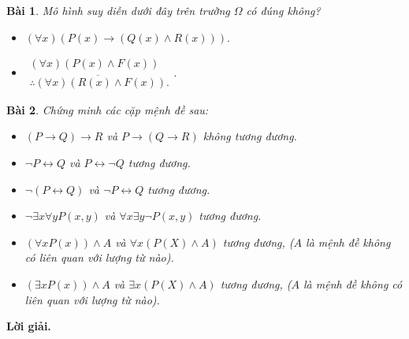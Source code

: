 \documentclass[11pt, oneside,openright,a4paper]{book}
\newtheorem{bt}{Bài }[section]
\begin{document}
\begin{bt}
Mô hình suy diễn dưới đây trên trường $\Omega$ có đúng không?
\begin{itemize}
\item[a)]$(\forall x) (P(x) \rightarrow (Q(x) \land R(x))).$
\item[b)] $\begin{matrix}
       (\forall x) (P(x) \land F(x))\\
    \overline{\therefore (\forall x)(R(x) \land F(x))}.
\end{matrix}.$
\end{itemize}

\end{bt}
\begin{bt}
Chứng minh các cặp mệnh đề sau:
\begin{itemize}
\item[a)] $(P \rightarrow Q) \rightarrow R$ và $P \rightarrow (Q \rightarrow R)$ không tương đương.
    \item[b)] $\lnot P \leftrightarrow Q$ và $ P \leftrightarrow \lnot Q$ tương đương.
    \item[c)] $\lnot (P \leftrightarrow Q)$ và $ \lnot P \leftrightarrow Q$ tương đương.
    \item[d)] $\lnot \exists x \forall y P(x,y)$ và $\forall x \exists y \lnot P(x,y)$ tương đương.
    \item[e)] $(\forall x P(x)) \land A$ và $\forall x (P(X) \land A)$ tương đương, ($A$ là mệnh đề không có liên quan với lượng từ nào).
    \item[f)] $(\exists x P(x)) \land A$ và $\exists x (P(X) \land A)$ tương đương, ($A$ là mệnh đề không có liên quan với lượng từ nào).
\end{itemize}

\end{bt}

{\bf Lời giải.} 
\end{document}
